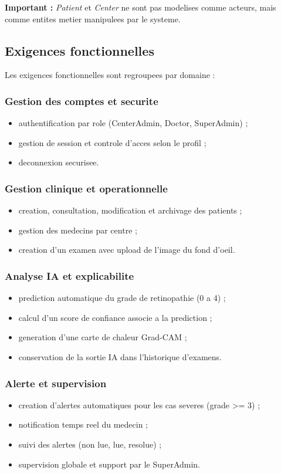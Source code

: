 \textbf{Important :} \textit{Patient} et \textit{Center} ne sont pas modelises comme acteurs,
mais comme entites metier manipulees par le systeme.

\subsection{Exigences fonctionnelles}
Les exigences fonctionnelles sont regroupees par domaine :

\subsubsection*{Gestion des comptes et securite}
\begin{itemize}
    \item authentification par role (CenterAdmin, Doctor, SuperAdmin) ;
    \item gestion de session et controle d'acces selon le profil ;
    \item deconnexion securisee.
\end{itemize}

\subsubsection*{Gestion clinique et operationnelle}
\begin{itemize}
    \item creation, consultation, modification et archivage des patients ;
    \item gestion des medecins par centre ;
    \item creation d'un examen avec upload de l'image du fond d'oeil.
\end{itemize}

\subsubsection*{Analyse IA et explicabilite}
\begin{itemize}
    \item prediction automatique du grade de retinopathie (0 a 4) ;
    \item calcul d'un score de confiance associe a la prediction ;
    \item generation d'une carte de chaleur Grad-CAM ;
    \item conservation de la sortie IA dans l'historique d'examens.
\end{itemize}

\subsubsection*{Alerte et supervision}
\begin{itemize}
    \item creation d'alertes automatiques pour les cas severes (grade >= 3) ;
    \item notification temps reel du medecin ;
    \item suivi des alertes (non lue, lue, resolue) ;
    \item supervision globale et support par le SuperAdmin.
\end{itemize}

